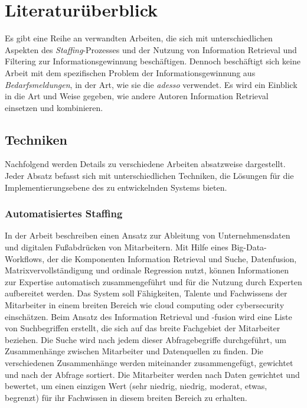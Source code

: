 \chapter{Literaturüberblick}
\label{sec:literaturueberblick}
Es gibt eine Reihe an verwandten Arbeiten, die sich mit unterschiedlichen Aspekten des \emph{Staffing}-Prozesses und der Nutzung von Information Retrieval und Filtering zur Informationsgewinnung beschäftigen. Dennoch beschäftigt sich keine Arbeit mit dem spezifischen Problem der Informationsgewinnung aus \emph{Bedarfsmeldungen}, in der Art, wie sie die \emph{adesso} verwendet. Es wird ein Einblick in die Art und Weise gegeben, wie andere Autoren Information Retrieval einsetzen und kombinieren.\\
\section{Techniken}
Nachfolgend werden Details zu verschiedene Arbeiten absatzweise dargestellt. Jeder Absatz befasst sich mit unterschiedlichen Techniken, die Lösungen für die Implementierungsebene des zu entwickelnden Systems bieten.
\subsection*{Automatisiertes Staffing}
In der Arbeit \cite{horesh2016information} beschreiben \citeauthor{horesh2016information} einen Ansatz zur Ableitung von Unternehmensdaten und digitalen Fußabdrücken von Mitarbeitern. Mit Hilfe eines Big-Data-Workflows, der die Komponenten Information Retrieval und Suche, Datenfusion, Matrixvervollständigung und ordinale Regression nutzt, können Informationen zur Expertise automatisch zusammengeführt und für die Nutzung durch Experten aufbereitet werden. Das System soll Fähigkeiten, Talente und Fachwissens der Mitarbeiter in einem breiten Bereich wie cloud computing oder cybersecurity einschätzen. Beim Ansatz des Information Retrieval und -fusion wird eine Liste von Suchbegriffen erstellt, die sich auf das breite Fachgebiet der Mitarbeiter beziehen. Die Suche wird nach jedem dieser Abfragebegriffe durchgeführt, um Zusammenhänge zwischen Mitarbeiter und Datenquellen zu finden. Die verschiedenen Zusammenhänge werden miteinander zusammengefügt, gewichtet und nach der Abfrage sortiert. Die Mitarbeiter werden nach Daten gewichtet und bewertet, um einen einzigen Wert (sehr niedrig, niedrig, moderat, etwas, begrenzt) für ihr Fachwissen in diesem breiten Bereich zu erhalten.\\
